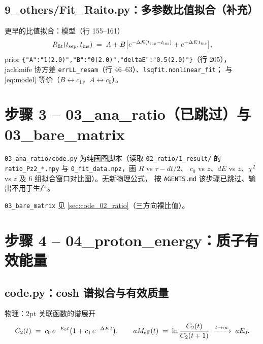 \documentclass[UTF8,11pt]{ctexart}
\begin{document}
\subsection{9\_others/Fit\_Raito.py：多参数比值拟合（补充）}
\label{sec:fit_ratio_old}

更早的比值拟合：模型（行 155--161）
\begin{equation}
  R_{\rm fit}(t_{\rm sep}, t_{\rm ins})
  \;=\; A + B\big[e^{-\Delta E(t_{\rm sep}-t_{\rm ins})}+e^{-\Delta E\,t_{\rm ins}}\big],
\end{equation}
prior \texttt{\{"A":"1(2.0)","B":"0(2.0)","deltaE":"0.5(2.0)"\}}（行 205），
jackknife 协方差 \texttt{errLL\_resam}（行 46--63）、\texttt{lsqfit.nonlinear\_fit}；
与\eqref{eq:model} 等价（$B\leftrightarrow c_1$，$A\leftrightarrow c_0$）。

\section{步骤 3 -- 03\_ana\_ratio（已跳过）与 03\_bare\_matrix}
\label{sec:step3}

\texttt{03\_ana\_ratio/code.py} 为纯画图脚本（读取 \texttt{02\_ratio/1\_result/} 的
\texttt{ratio\_Pz2\_*.npy} 与 \texttt{0\_fit\_data.npz}，画 $R$ vs $\tau-dt/2$、
$c_0$ vs $z$、$dE$ vs $z$、$\chi^2$ vs $z$ 及 6 组拟合窗口对比图）。无新物理公式，
按 \texttt{AGENTS.md} 该步骤已跳过、输出不用于生产。

\texttt{03\_bare\_matrix} 见 \ref{sec:code_02_ratio}（三方向裸比值）。

\section{步骤 4 -- 04\_proton\_energy：质子有效能量}
\label{sec:step4}

\subsection{code.py：cosh 谱拟合与有效质量}
\label{sec:energy}

物理：2pt 关联函数的谱展开
\begin{equation}
  \label{eq:2pt_spectrum}
  C_2(t)\;=\;c_0\,e^{-E_0 t}\big(1 + c_1\,e^{-\Delta E\,t}\big),
  \qquad
  aM_{\rm eff}(t)\;=\;\ln\frac{C_2(t)}{C_2(t+1)}\;\xrightarrow{t\to\infty}\;aE_0.
\end{equation}
\end{document}
